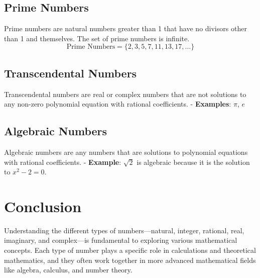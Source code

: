 \documentclass{article}
\begin{document}
\subsection{Prime Numbers}
Prime numbers are natural numbers greater than 1 that have no divisors other than 1 and themselves. The set of prime numbers is infinite.
\[
\text{Prime Numbers} = \{2, 3, 5, 7, 11, 13, 17, \dots\}
\]

\subsection{Transcendental Numbers}
Transcendental numbers are real or complex numbers that are not solutions to any non-zero polynomial equation with rational coefficients.
- \textbf{Examples}: \( \pi \), \( e \)

\subsection{Algebraic Numbers}
Algebraic numbers are any numbers that are solutions to polynomial equations with rational coefficients.
- \textbf{Example}: \( \sqrt{2} \) is algebraic because it is the solution to \( x^2 - 2 = 0 \).

\section{Conclusion}
Understanding the different types of numbers—natural, integer, rational, real, imaginary, and complex—is fundamental to exploring various mathematical concepts. Each type of number plays a specific role in calculations and theoretical mathematics, and they often work together in more advanced mathematical fields like algebra, calculus, and number theory.
\end{document}

